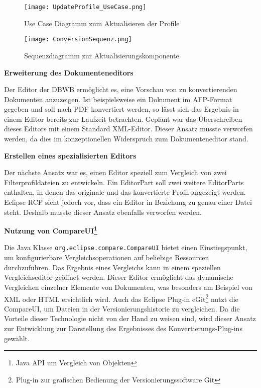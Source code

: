 {{{\begin{figure}[htbp] 
  \centering
     \texttt{[image: UpdateProfile\_UseCase.png]}
  \caption{Use Case Diagramm zum Aktualisieren der Profile}
  \label{fig:UpdateProfile_UseCase}
\end{figure}

\begin{figure}[htbp] 
  \centering
     \texttt{[image: ConversionSequenz.png]}
  \caption{Sequenzdiagramm zur Aktualisierungskomponente}
  \label{fig:ConversionSequenz}
\end{figure}






\textbf{Erweiterung des Dokumenteneditors}{

Der Editor der \ac{DBWB} ermöglicht es, eine Vorschau von zu konvertierenden Dokumenten anzuzeigen. Ist beispielsweise ein Dokument im \ac{AFP}-Format gegeben und soll nach \ac{PDF} konvertiert werden, so lässt sich das Ergebnis in einem Editor bereits zur Laufzeit betrachten. Geplant war das Überschreiben dieses Editors mit einem Standard XML-Editor. Dieser Ansatz musste verworfen werden, da dies im konzeptionellen Widerspruch zum Dokumenteneditor stand.

}

\textbf{Erstellen eines spezialisierten Editors}{

Der nächste Ansatz war es, einen Editor speziell zum Vergleich von zwei Filterprofildateien zu entwickeln. Ein EditorPart soll zwei weitere EditorParts enthalten, in denen das originale und das konvertierte Profil angezeigt werden. Eclipse \ac{RCP} sieht jedoch vor, dass ein Editor in Beziehung zu genau einer Datei steht. Deshalb musste dieser Ansatz ebenfalls verworfen werden. 

}

\textbf{Nutzung von CompareUI\footnote{Java \ac{API}
 um Vergleich von Objekten}}{
 
 Die Java Klasse \texttt{org.eclipse.compare.CompareUI} bietet einen Einstiegspunkt, um konfigurierbare Vergleichsoperationen auf beliebige Ressourcen durchzuführen. Das Ergebnis eines Vergleichs kann in einem speziellen Vergleichseditor geöffnet werden. Dieser Editor ermöglicht das dynamische Vergleichen einzelner Elemente von Dokumenten, was besonders am Beispiel von \ac{XML} oder \ac{HTML} ersichtlich wird. Auch das Eclipse Plug-in eGit\footnote{Plug-in zur grafischen Bedienung der Versionierungssoftware Git} nutzt die CompareUI, um Dateien in der Versionierungshistorie zu vergleichen. Da die Vorteile dieser Technologie nicht von der Hand zu weisen sind, wird dieser Ansatz zur Entwicklung zur Darstellung des Ergebnisses des Konvertierungs-Plug-ins gewählt.

}}}}
